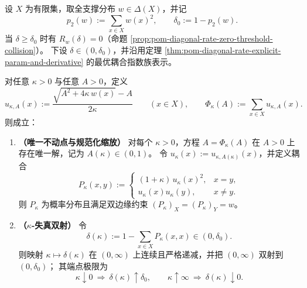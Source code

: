 
\begin{theorem}\label{thm:pom-diagonal-rate-scalar-collapse}
设 \(X\) 为有限集，取全支撑分布 \(w\in\Delta(X)\)，并记
\[
p_2(w):=\sum_{x\in X}w(x)^2,
\qquad
\delta_0:=1-p_2(w).
\]
当 \(\delta\ge \delta_0\) 时有 \(R_w(\delta)=0\)（命题 \ref{prop:pom-diagonal-rate-zero-threshold-collision}）。
下设 \(\delta\in(0,\delta_0)\)，并沿用定理 \ref{thm:pom-diagonal-rate-explicit-param-and-derivative} 的最优耦合指数族表示。
\par
对任意 \(\kappa>0\) 与任意 \(A>0\)，定义
\[
u_{\kappa,A}(x):=\frac{\sqrt{A^2+4\kappa\,w(x)}-A}{2\kappa}\qquad(x\in X),
\qquad
\Phi_\kappa(A):=\sum_{x\in X}u_{\kappa,A}(x).
\]
则成立：
\begin{enumerate}
  \item \textbf{（唯一不动点与规范化缩放）}
  对每个 \(\kappa>0\)，方程 \(A=\Phi_\kappa(A)\) 在 \(A>0\) 上存在唯一解，记为 \(A(\kappa)\in(0,1)\)。
  令 \(u_\kappa(x):=u_{\kappa,A(\kappa)}(x)\)，并定义耦合
  \[
  P_\kappa(x,y):=
  \begin{cases}
  (1+\kappa)\,u_\kappa(x)^2, & x=y,\\
  u_\kappa(x)u_\kappa(y), & x\ne y.
  \end{cases}
  \]
  则 \(P_\kappa\) 为概率分布且满足双边缘约束 \((P_\kappa)_X=(P_\kappa)_Y=w\)。

  \item \textbf{（\(\kappa\)-失真双射）}
  令
  \[
  \delta(\kappa):=1-\sum_{x\in X}P_\kappa(x,x)\in(0,\delta_0).
  \]
  则映射 \(\kappa\mapsto \delta(\kappa)\) 在 \((0,\infty)\) 上连续且严格递减，并把 \((0,\infty)\) 双射到 \((0,\delta_0)\)；
  其端点极限为
  \[
  \kappa\downarrow 0\ \Longrightarrow\ \delta(\kappa)\uparrow\delta_0,
  \qquad
  \kappa\uparrow\infty\ \Longrightarrow\ \delta(\kappa)\downarrow 0.
  \]
\end{enumerate}
\end{theorem}
